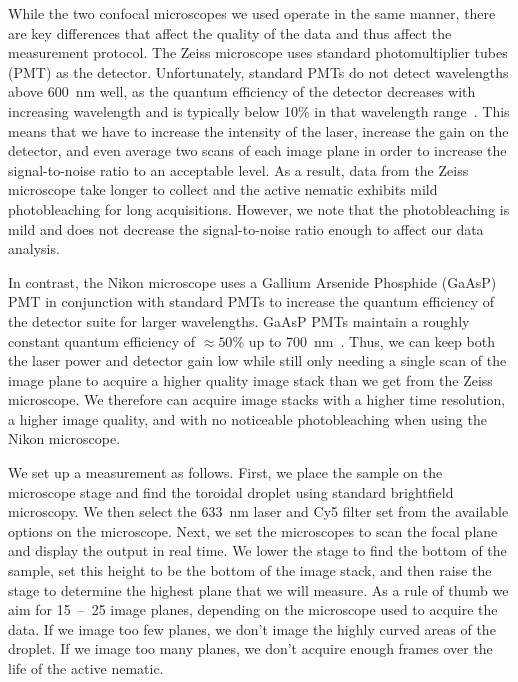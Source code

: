 While the two confocal microscopes we used operate in the same manner, there are key differences that affect the quality of the data and thus affect the measurement protocol.
The Zeiss microscope uses standard photomultiplier tubes (PMT) as the detector.
Unfortunately, standard PMTs do not detect wavelengths above 600~nm well, as the quantum efficiency of the detector decreases with increasing wavelength and is typically below 10\% in that wavelength range~\cite{RN263}.
This means that we have to increase the intensity of the laser, increase the gain on the detector, and even average two scans of each image plane in order to increase the signal-to-noise ratio to an acceptable level.
As a result, data from the Zeiss microscope take longer to collect and the active nematic exhibits mild photobleaching for long acquisitions.
However, we note that the photobleaching is mild and does not decrease the signal-to-noise ratio enough to affect our data analysis.

In contrast, the Nikon microscope uses a Gallium Arsenide Phosphide (GaAsP) PMT in conjunction with standard PMTs to increase the quantum efficiency of the detector suite for larger wavelengths.
GaAsP PMTs maintain a roughly constant quantum efficiency of $\approx 50$\% up to 700~nm~\cite{RN263}.
Thus, we can keep both the laser power and detector gain low while still only needing a single scan of the image plane to acquire a higher quality image stack than we get from the Zeiss microscope.
We therefore can acquire image stacks with a higher time resolution, a higher image quality, and with no noticeable photobleaching when using the Nikon microscope.

We set up a measurement as follows.
First, we place the sample on the microscope stage and find the toroidal droplet using standard brightfield microscopy.
We then select the 633~nm laser and Cy5 filter set from the available options on the microscope.
Next, we set the microscopes to scan the focal plane and display the output in real time.
We lower the stage to find the bottom of the sample, set this height to be the bottom of the image stack, and then raise the stage to determine the highest plane that we will measure.
As a rule of thumb we aim for 15~--~25 image planes, depending on the microscope used to acquire the data.
If we image too few planes, we don't image the highly curved areas of the droplet.
If we image too many planes, we don't acquire enough frames over the life of the active nematic.

